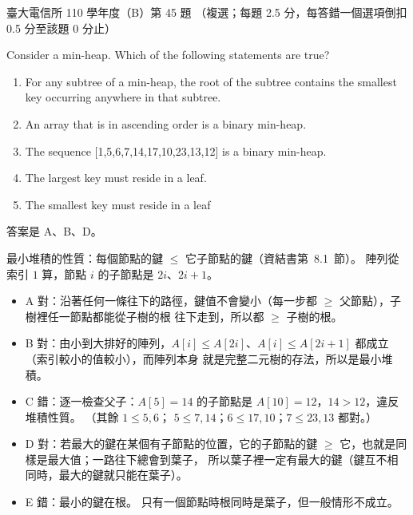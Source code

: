 \begin{pastexam}[label={px:ntu-110-comm-dsa-45}]{臺大電信所 110 學年度（B）第 45 題}
（複選；每題 2.5 分，每答錯一個選項倒扣 0.5 分至該題 0 分止）

Consider a min-heap. Which of the following statements are true?
\begin{enumerate}[label=\Alph*.]
\item For any subtree of a min-heap, the root of the subtree contains the smallest key occurring anywhere in that subtree.
\item An array that is in ascending order is a binary min-heap.
\item The sequence [1,5,6,7,14,17,10,23,13,12] is a binary min-heap.
\item The largest key must reside in a leaf.
\item The smallest key must reside in a leaf
\end{enumerate}
\end{pastexam}

\begin{pastsoln}
答案是 A、B、D。

最小堆積的性質：每個節點的鍵 $\le$ 它子節點的鍵（資結書第~8.1~節）。 陣列從索引 $1$ 算，節點 $i$ 的子節點是
$2i$、$2i + 1$。
\begin{itemize}
\item A 對：沿著任何一條往下的路徑，鍵值不會變小（每一步都 $\ge$ 父節點），子樹裡任一節點都能從子樹的根
往下走到，所以都 $\ge$ 子樹的根。
\item B 對：由小到大排好的陣列，$A[i] \le A[2i]$、$A[i] \le A[2i + 1]$ 都成立（索引較小的值較小），而陣列本身
就是完整二元樹的存法，所以是最小堆積。
\item C 錯：逐一檢查父子：$A[5] = 14$ 的子節點是 $A[10] = 12$，$14 > 12$，違反堆積性質。 （其餘 $1 \le 5, 6$；
$5 \le 7, 14$；$6 \le 17, 10$；$7 \le 23, 13$ 都對。）
\item D 對：若最大的鍵在某個有子節點的位置，它的子節點的鍵 $\ge$ 它，也就是同樣是最大值；一路往下總會到葉子，
所以葉子裡一定有最大的鍵（鍵互不相同時，最大的鍵就只能在葉子）。
\item E 錯：最小的鍵在根。 只有一個節點時根同時是葉子，但一般情形不成立。
\end{itemize}
\end{pastsoln}

